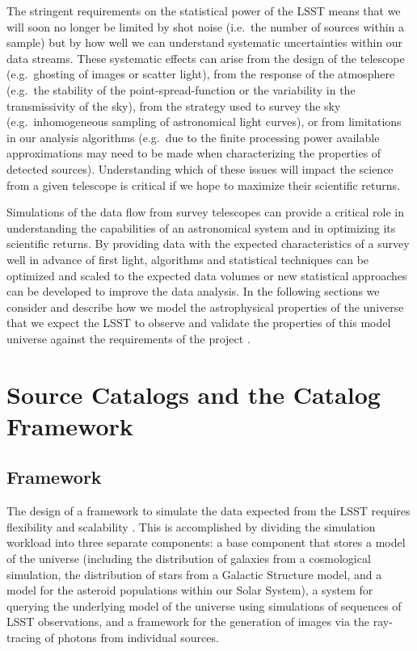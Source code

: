 \documentclass[]{article}
\begin{document}
The stringent requirements on the statistical power of the LSST means
that we will soon no longer be limited by shot noise (i.e.\ the number
of sources within a sample) but by how well we can understand
systematic uncertainties within our data streams. These systematic
effects can arise from the design of the telescope (e.g.\ ghosting of
images or scatter light), from the response of the atmosphere (e.g.\
the stability of the point-spread-function or the variability in the
transmissivity of the sky), from the strategy used to survey the sky
(e.g.\ inhomogeneous sampling of astronomical light curves), or from
limitations in our analysis algorithms (e.g.\ due to the finite
processing power available approximations may need to be made when
characterizing the properties of detected sources). Understanding
which of these issues will impact the science from a given telescope
is critical if we hope to maximize their scientific returns.

Simulations of the data flow from survey telescopes can provide a
critical role in understanding the capabilities of an astronomical
system and in optimizing its scientific returns. By providing data
with the expected characteristics of a survey well in advance of first
light, algorithms and statistical techniques can be optimized and
scaled to the expected data volumes or new statistical approaches can
be developed to improve the data analysis.  In the following sections
we consider and describe how we model the astrophysical properties of
the universe that we expect the LSST to observe and validate the
properties of this model universe against the requirements of the
project \citep{requirements}.

\section{Source Catalogs and the Catalog Framework}

\subsection{Framework}

The design of a framework to simulate the data expected from the LSST
requires flexibility and scalability \citep{connolly10}.
This is accomplished by dividing the simulation workload into three
separate components: a base component that stores a model of the
universe (including the distribution of galaxies from a cosmological
simulation, the distribution of stars from a Galactic Structure model,
and a model for the asteroid populations within our Solar System), a
system for querying the underlying model of the universe using
simulations of sequences of LSST observations, and a framework for the
generation of images via the ray-tracing of photons from individual
sources.
\end{document}
